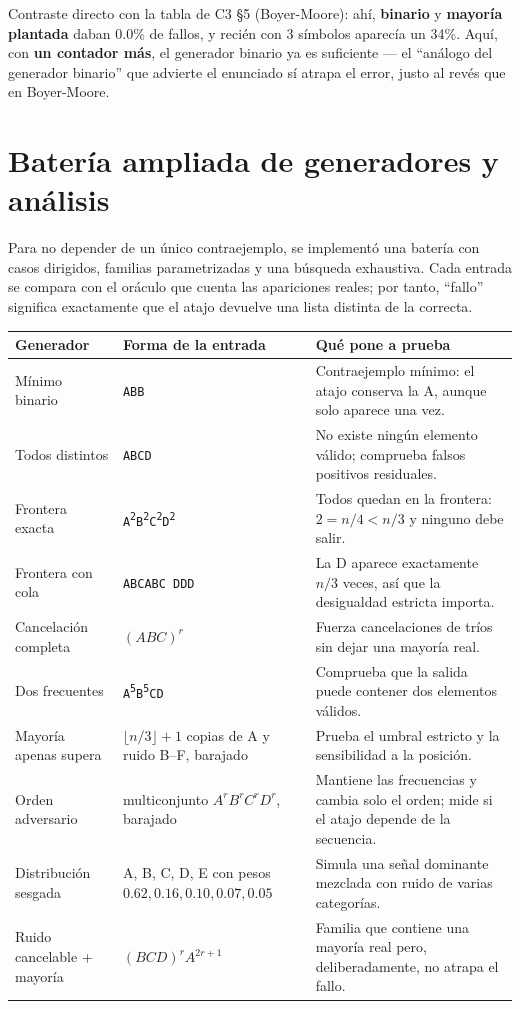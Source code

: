 \documentclass[11pt]{article}
\begin{document}
Contraste directo con la tabla de C3 §5 (Boyer-Moore): ahí, \textbf{binario} y \textbf{mayoría plantada}
daban 0.0\% de fallos, y recién con 3 símbolos aparecía un 34\%. Aquí, con \textbf{un contador más},
el generador binario ya es suficiente --- el ``análogo del generador binario'' que advierte el enunciado
sí atrapa el error, justo al revés que en Boyer-Moore.

\section{Batería ampliada de generadores y análisis}

Para no depender de un único contraejemplo, se implementó una batería con casos dirigidos, familias
parametrizadas y una búsqueda exhaustiva. Cada entrada se compara con el oráculo que cuenta las apariciones
reales; por tanto, ``fallo'' significa exactamente que el atajo devuelve una lista distinta de la correcta.

\begin{center}
\small
\renewcommand{\arraystretch}{1.18}
\begin{tabular}{>{\raggedright\arraybackslash}p{.22\linewidth}
                >{\raggedright\arraybackslash}p{.30\linewidth}
                >{\raggedright\arraybackslash}p{.36\linewidth}}
\toprule
\textbf{Generador} & \textbf{Forma de la entrada} & \textbf{Qué pone a prueba} \\
\midrule
Mínimo binario & \texttt{ABB} & Contraejemplo mínimo: el atajo conserva la A, aunque solo aparece una vez. \\
Todos distintos & \texttt{ABCD} & No existe ningún elemento válido; comprueba falsos positivos residuales. \\
Frontera exacta & \texttt{A\textsuperscript{2}B\textsuperscript{2}C\textsuperscript{2}D\textsuperscript{2}} & Todos quedan en la frontera: $2=n/4<n/3$ y ninguno debe salir. \\
Frontera con cola & \texttt{ABCABC DDD} & La D aparece exactamente $n/3$ veces, así que la desigualdad estricta importa. \\
Cancelación completa & $(ABC)^r$ & Fuerza cancelaciones de tríos sin dejar una mayoría real. \\
Dos frecuentes & \texttt{A\textsuperscript{5}B\textsuperscript{5}CD} & Comprueba que la salida puede contener dos elementos válidos. \\
Mayoría apenas supera & $\lfloor n/3\rfloor+1$ copias de A y ruido B--F, barajado & Prueba el umbral estricto y la sensibilidad a la posición. \\
Orden adversario & multiconjunto $A^rB^rC^rD^r$, barajado & Mantiene las frecuencias y cambia solo el orden; mide si el atajo depende de la secuencia. \\
Distribución sesgada & A, B, C, D, E con pesos $0.62,0.16,0.10,0.07,0.05$ & Simula una señal dominante mezclada con ruido de varias categorías. \\
Ruido cancelable + mayoría & $(BCD)^rA^{2r+1}$ & Familia que contiene una mayoría real pero, deliberadamente, no atrapa el fallo. \\
\bottomrule
\end{tabular}
\end{center}
\end{document}
